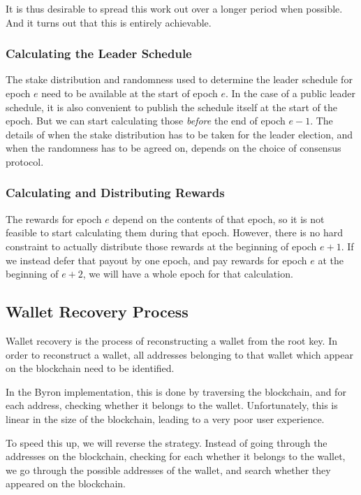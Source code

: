 \documentclass[11pt,a4paper,dvipsnames,twosided]{article}
\begin{document}
It is thus desirable to spread this work out over a longer period when possible.
And it turns out that this is entirely achievable.

\subsubsection{Calculating the Leader Schedule}

The stake distribution and randomness used to determine the leader schedule for
epoch \(e\) need to be available at the start of epoch \(e\). In the case of a
public leader schedule, it is also convenient to publish the schedule itself at
the start of the epoch. But we can start calculating those \emph{before} the end
of epoch \(e-1\). The details of when the stake distribution has to be taken for
the leader election, and when the randomness has to be agreed on, depends on the
choice of consensus protocol.

\subsubsection{Calculating and Distributing Rewards}

The rewards for epoch \(e\) depend on the contents of that epoch, so it is not
feasible to start calculating them during that epoch. However, there is no hard
constraint to actually distribute those rewards at the beginning of epoch
\(e+1\). If we instead defer that payout by one epoch, and pay rewards for epoch
\(e\) at the beginning of \(e+2\), we will have a whole epoch for that
calculation.

\subsection{Wallet Recovery Process}
\label{wallet-recovery-process}

Wallet recovery is the process of reconstructing a wallet from the root
key. In order to reconstruct a wallet, all addresses belonging to that
wallet which appear on the blockchain need to be identified.

In the Byron implementation, this is done by traversing the
blockchain, and for each address, checking whether it belongs to the
wallet. Unfortunately, this is linear in the size of the blockchain,
leading to a very poor user experience.

To speed this up, we will reverse the strategy. Instead of going through
the addresses on the blockchain, checking for each whether it belongs to
the wallet, we go through the possible addresses of the wallet, and
search whether they appeared on the blockchain.
\end{document}
